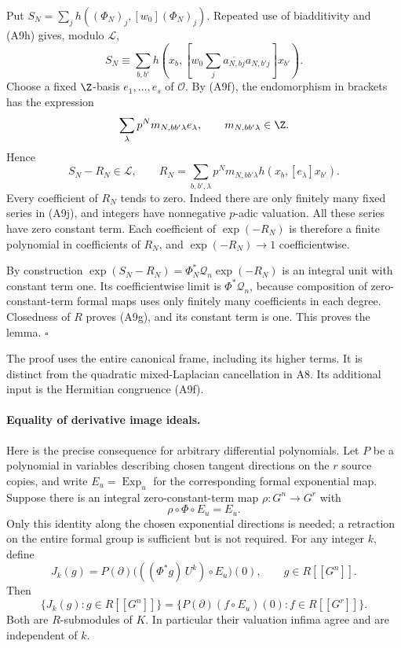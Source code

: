 Put $S_N=\sum_j h((\Phi_N)_j,[w_0](\Phi_N)_j)$.
Repeated use of biadditivity and (A9h) gives, modulo
$\mathcal L$,
\[
 S_N\equiv
  \sum_{b,b'}h\left(x_b,
       \left[w_0\sum_j\overline{a_{N,bj}}a_{N,b'j}\right]x_{b'}
            \right).
 \tag{A9i}
\]
Choose a fixed $\Z$-basis $e_1,\ldots,e_s$ of $\mathcal O$.
By (A9f), the endomorphism in brackets has the expression
\[
 \sum_\lambda p^N m_{N,bb'\lambda}e_\lambda,
 \qquad m_{N,bb'\lambda}\in\Z.
\]
Hence
\[
 S_N-R_N\in\mathcal L,\qquad
 R_N=\sum_{b,b',\lambda}
       p^N m_{N,bb'\lambda}h(x_b,[e_\lambda]x_{b'}).
 \tag{A9j}
\]
Every coefficient of $R_N$ tends to zero.  Indeed there are
only finitely many fixed series in (A9j), and integers have
nonnegative $p$-adic valuation.  All these series have zero
constant term.  Each coefficient of $\exp(-R_N)$ is therefore
a finite polynomial in coefficients of $R_N$, and
$\exp(-R_N)\to1$ coefficientwise.

By construction
$\exp(S_N-R_N)=\Phi_N^*\mathcal Q_n\exp(-R_N)$ is an integral
unit with constant term one.  Its coefficientwise limit is
$\Phi^*\mathcal Q_n$, because composition of zero-constant-term
formal maps uses only finitely many coefficients in each
degree.  Closedness of $R$ proves (A9g), and its constant term
is one.  This proves the lemma. \hfill$\square$

The proof uses the entire canonical frame, including its
higher terms.  It is distinct from the quadratic
mixed-Laplacian cancellation in A8.  Its additional input is
the Hermitian congruence (A9f).

\paragraph{Equality of derivative image ideals.}
Here is the precise consequence for arbitrary differential
polynomials.  Let $P$ be a polynomial in variables describing
chosen tangent directions on the $r$ source copies, and write
$E_u=\operatorname{Exp}_u$ for the corresponding formal
exponential map.  Suppose there is an integral zero-constant-term
map $\rho:G^n\to G^r$ with
\[
                   \rho\circ\Phi\circ E_u=E_u.
 \tag{A9k}
\]
Only this identity along the chosen exponential directions is
needed; a retraction on the entire formal group is sufficient
but is not required.  For any integer $k$, define
\[
 J_k(g)
   =P(\partial)\bigl(((\Phi^*g)\,U^k)
                         \circ E_u\bigr)(0),
          \qquad g\in R[[G^n]].
 \tag{A9l}
\]
Then
\[
 \{J_k(g):g\in R[[G^n]]\}
   =\{P(\partial)(f\circ E_u)(0):f\in R[[G^r]]\}.
 \tag{A9m}
\]
Both are $R$-submodules of $K$.  In particular their
valuation infima agree and are independent of $k$.

